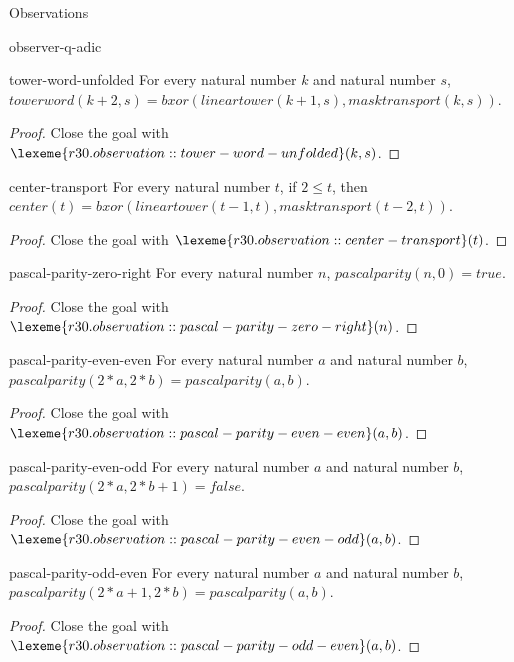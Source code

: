 \begin{lexlean}{Observations}
\begin{section}{observer-q-adic}
\begin{theorem}{tower-word-unfolded}
For every natural number \(k\) and natural number \(s\), \(towerword(k + 2, s) = bxor(lineartower(k + 1, s), masktransport(k, s))\).
\begin{proof}
Close the goal with \(\lexeme{r30.observation::tower-word-unfolded}(k, s)\).
\end{proof}
\end{theorem}

\begin{theorem}{center-transport}
For every natural number \(t\), if \(2 ≤ t\), then \(center(t) = bxor(lineartower(t - 1, t), masktransport(t - 2, t))\).
\begin{proof}
Close the goal with \(\lexeme{r30.observation::center-transport}(t)\).
\end{proof}
\end{theorem}

\begin{theorem}{pascal-parity-zero-right}
For every natural number \(n\), \(pascalparity(n, 0) = true\).
\begin{proof}
Close the goal with \(\lexeme{r30.observation::pascal-parity-zero-right}(n)\).
\end{proof}
\end{theorem}

\begin{theorem}{pascal-parity-even-even}
For every natural number \(a\) and natural number \(b\), \(pascalparity(2 * a, 2 * b) = pascalparity(a, b)\).
\begin{proof}
Close the goal with \(\lexeme{r30.observation::pascal-parity-even-even}(a, b)\).
\end{proof}
\end{theorem}

\begin{theorem}{pascal-parity-even-odd}
For every natural number \(a\) and natural number \(b\), \(pascalparity(2 * a, 2 * b + 1) = false\).
\begin{proof}
Close the goal with \(\lexeme{r30.observation::pascal-parity-even-odd}(a, b)\).
\end{proof}
\end{theorem}

\begin{theorem}{pascal-parity-odd-even}
For every natural number \(a\) and natural number \(b\), \(pascalparity(2 * a + 1, 2 * b) = pascalparity(a, b)\).
\begin{proof}
Close the goal with \(\lexeme{r30.observation::pascal-parity-odd-even}(a, b)\).
\end{proof}
\end{theorem}


\end{section}
\end{lexlean}
